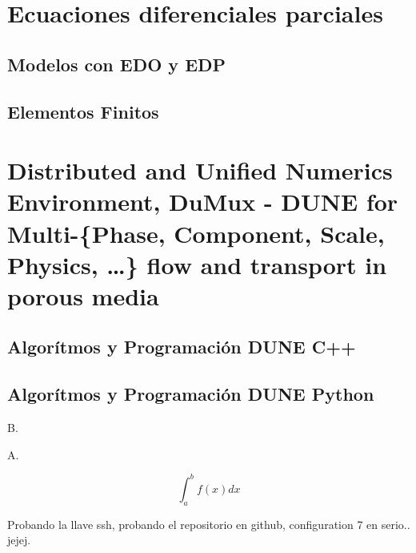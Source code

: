 \documentclass[10pt,
	a4paper,
	spanish,
	titlepage=firstiscover,
	titlepage=true,
	BCOR=2cm,
	DIV=12
]{scrbook}
\begin{document}
\begin{refsection}
	\part{Ecuaciones diferenciales parciales} %
	\chapter{Modelos con EDO y EDP}
	
	\chapter{Elementos Finitos}
	\part{Distributed and Unified Numerics Environment, DuMux - DUNE for Multi-\{Phase, Component, Scale, Physics, \dots\} flow and transport in porous media} %
	\chapter{Algorítmos y Programación DUNE C++} %
	\chapter{Algorítmos y Programación DUNE Python}

	B.\cite{Reilly}

	\printbibliography[
	title={Referencias},
	heading=bibintoc]
	\nocite{*}
	\printbibliography[
	title={Bibliografía},
	heading=none,keyword=paper]
\end{refsection}

A.

$$\int_a^b f(x)dx$$

Probando la llave ssh, probando el repositorio en github, configuration 7 en serio.. jejej.

\printindex
\end{document}
